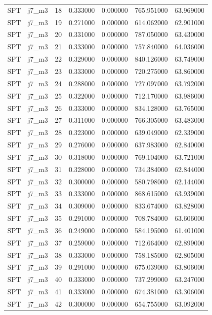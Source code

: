 \begin{tabular}{llrrrrr}
SPT & j7_m3 & 18 & 0.333000 & 0.000000 & 765.951000 & 63.969000 \\
SPT & j7_m3 & 19 & 0.271000 & 0.000000 & 614.062000 & 62.901000 \\
SPT & j7_m3 & 20 & 0.331000 & 0.000000 & 787.050000 & 63.430000 \\
SPT & j7_m3 & 21 & 0.333000 & 0.000000 & 757.840000 & 64.036000 \\
SPT & j7_m3 & 22 & 0.329000 & 0.000000 & 840.126000 & 63.749000 \\
SPT & j7_m3 & 23 & 0.333000 & 0.000000 & 720.275000 & 63.860000 \\
SPT & j7_m3 & 24 & 0.288000 & 0.000000 & 727.097000 & 63.792000 \\
SPT & j7_m3 & 25 & 0.322000 & 0.000000 & 712.170000 & 63.986000 \\
SPT & j7_m3 & 26 & 0.333000 & 0.000000 & 834.128000 & 63.765000 \\
SPT & j7_m3 & 27 & 0.311000 & 0.000000 & 766.305000 & 63.483000 \\
SPT & j7_m3 & 28 & 0.323000 & 0.000000 & 639.049000 & 62.339000 \\
SPT & j7_m3 & 29 & 0.276000 & 0.000000 & 637.983000 & 62.840000 \\
SPT & j7_m3 & 30 & 0.318000 & 0.000000 & 769.104000 & 63.721000 \\
SPT & j7_m3 & 31 & 0.328000 & 0.000000 & 734.384000 & 62.844000 \\
SPT & j7_m3 & 32 & 0.300000 & 0.000000 & 580.798000 & 62.144000 \\
SPT & j7_m3 & 33 & 0.333000 & 0.000000 & 868.615000 & 63.939000 \\
SPT & j7_m3 & 34 & 0.309000 & 0.000000 & 833.674000 & 63.828000 \\
SPT & j7_m3 & 35 & 0.291000 & 0.000000 & 708.784000 & 63.606000 \\
SPT & j7_m3 & 36 & 0.249000 & 0.000000 & 584.195000 & 61.401000 \\
SPT & j7_m3 & 37 & 0.259000 & 0.000000 & 712.664000 & 62.899000 \\
SPT & j7_m3 & 38 & 0.333000 & 0.000000 & 758.185000 & 62.805000 \\
SPT & j7_m3 & 39 & 0.291000 & 0.000000 & 675.039000 & 63.806000 \\
SPT & j7_m3 & 40 & 0.333000 & 0.000000 & 737.299000 & 63.247000 \\
SPT & j7_m3 & 41 & 0.333000 & 0.000000 & 674.381000 & 63.306000 \\
SPT & j7_m3 & 42 & 0.300000 & 0.000000 & 654.755000 & 63.092000 \\

\end{tabular}
